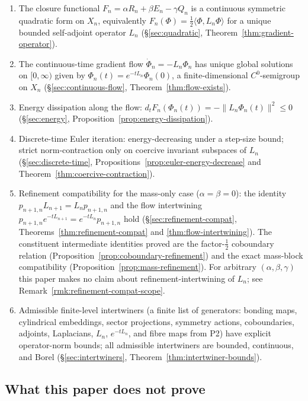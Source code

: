 \documentclass[11pt, a4paper]{amsart}
\theoremstyle{definition}
\begin{document}
\begin{enumerate}
\item The closure functional $F_n = \alpha R_n + \beta E_n -
  \gamma Q_n$ is a continuous symmetric quadratic form on $X_n$,
  equivalently $F_n(\Phi) = \tfrac{1}{2}\langle \Phi, L_n \Phi
  \rangle$ for a unique bounded self-adjoint operator $L_n$
  (\S\ref{sec:quadratic}, Theorem~\ref{thm:gradient-operator}).
\item The continuous-time gradient flow $\dot\Phi_n = -L_n \Phi_n$
  has unique global solutions on $[0, \infty)$ given by
  $\Phi_n(t) = e^{-t L_n} \Phi_n(0)$, a finite-dimensional
  $C^0$-semigroup on $X_n$
  (\S\ref{sec:continuous-flow}, Theorem~\ref{thm:flow-exists}).
\item Energy dissipation along the flow:
  $d_t F_n(\Phi_n(t)) = -\|L_n \Phi_n(t)\|^2 \leq 0$
  (\S\ref{sec:energy}, Proposition~\ref{prop:energy-dissipation}).
\item Discrete-time Euler iteration: energy-decreasing under a
  step-size bound; strict norm-contraction only on coercive
  invariant subspaces of $L_n$
  (\S\ref{sec:discrete-time}, Propositions~\ref{prop:euler-energy-decrease}
  and Theorem~\ref{thm:coercive-contraction}).
\item Refinement compatibility for the mass-only case
  ($\alpha = \beta = 0$): the identity $p_{n+1, n} L_{n+1} =
  L_n p_{n+1, n}$ and the flow intertwining
  $p_{n+1, n} e^{-t L_{n+1}} = e^{-t L_n} p_{n+1, n}$ hold
  (\S\ref{sec:refinement-compat},
  Theorems~\ref{thm:refinement-compat} and
  \ref{thm:flow-intertwining}). The constituent intermediate
  identities proved are the factor-$\tfrac{1}{2}$ coboundary
  relation (Proposition~\ref{prop:coboundary-refinement}) and the
  exact mass-block compatibility
  (Proposition~\ref{prop:mass-refinement}). For arbitrary
  $(\alpha, \beta, \gamma)$ this paper makes no claim about
  refinement-intertwining of $L_n$; see
  Remark~\ref{rmk:refinement-compat-scope}.
\item Admissible finite-level intertwiners (a finite list of
  generators: bonding maps, cylindrical embeddings, sector
  projections, symmetry actions, coboundaries, adjoints,
  Laplacians, $L_n$, $e^{-tL_n}$, and fibre maps from P2) have
  explicit operator-norm bounds; all admissible intertwiners are
  bounded, continuous, and Borel
  (\S\ref{sec:intertwiners}, Theorem~\ref{thm:intertwiner-bounds}).
\end{enumerate}

\subsection{What this paper does not prove}
\end{document}

